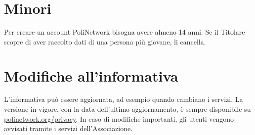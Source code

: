 \documentclass[legal]{polinetwork}
\begin{document}
\section{Minori}
\label{sec:minori}

Per creare un account PoliNetwork bisogna avere almeno 14 anni. Se il Titolare scopre di aver raccolto dati di una persona più giovane, li cancella.

\section{Modifiche all'informativa}
\label{sec:modifiche}

L'informativa può essere aggiornata, ad esempio quando cambiano i servizi. La versione in vigore, con la data dell'ultimo aggiornamento, è sempre disponibile su \href{https://polinetwork.org/privacy}{polinetwork.org/privacy}. In caso di modifiche importanti, gli utenti vengono avvisati tramite i servizi dell'Associazione.
\end{document}
